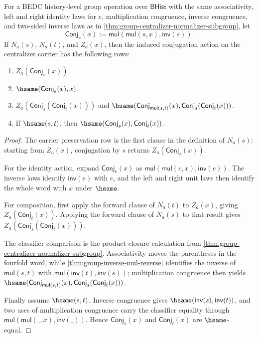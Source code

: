 \begin{theorem}
\label{thm:group-centralizer-normalizer-conjugation-action}
For a BEDC history-level group operation over $\mathsf{BHist}$ with the same
associativity, left and right identity laws for $e$, multiplication
congruence, inverse congruence, and two-sided inverse laws as in
\autoref{thm:group-centralizer-normalizer-subgroup}, let
$$
\mathsf{Conj}_s(x):=
\mathsf{mul}(\mathsf{mul}(s,x),\mathsf{inv}(s)).
$$
If $N_a(s)$, $N_a(t)$, and $Z_a(x)$, then the induced conjugation action on the
centralizer carrier has the following rows:
\begin{enumerate}
\item $Z_a(\mathsf{Conj}_s(x))$.
\item $\hsame(\mathsf{Conj}_e(x),x)$.
\item $Z_a(\mathsf{Conj}_s(\mathsf{Conj}_t(x)))$ and
$\hsame(\mathsf{Conj}_{\mathsf{mul}(s,t)}(x),
\mathsf{Conj}_s(\mathsf{Conj}_t(x)))$.
\item If $\hsame(s,t)$, then
$\hsame(\mathsf{Conj}_s(x),\mathsf{Conj}_t(x))$.
\end{enumerate}
\end{theorem}
\begin{proof}
The carrier preservation row is the first clause in the definition of $N_a(s)$:
starting from $Z_a(x)$, conjugation by $s$ returns
$Z_a(\mathsf{Conj}_s(x))$.

For the identity action, expand $\mathsf{Conj}_e(x)$ as
$\mathsf{mul}(\mathsf{mul}(e,x),\mathsf{inv}(e))$. The inverse laws identify
$\mathsf{inv}(e)$ with $e$, and the left and right unit laws then identify the
whole word with $x$ under $\hsame$.

For composition, first apply the forward clause of $N_a(t)$ to $Z_a(x)$, giving
$Z_a(\mathsf{Conj}_t(x))$. Applying the forward clause of $N_a(s)$ to that
result gives $Z_a(\mathsf{Conj}_s(\mathsf{Conj}_t(x)))$.

The classifier comparison is the product-closure calculation from
\autoref{thm:group-centralizer-normalizer-subgroup}. Associativity moves the
parentheses in the fourfold word, while
\autoref{thm:group-inverse-mul-reverse} identifies the inverse of
$\mathsf{mul}(s,t)$ with $\mathsf{mul}(\mathsf{inv}(t),\mathsf{inv}(s))$;
multiplication congruence then yields
$\hsame(\mathsf{Conj}_{\mathsf{mul}(s,t)}(x),
\mathsf{Conj}_s(\mathsf{Conj}_t(x)))$.

Finally assume $\hsame(s,t)$. Inverse congruence gives
$\hsame(\mathsf{inv}(s),\mathsf{inv}(t))$, and two uses of multiplication
congruence carry the classifier equality through
$\mathsf{mul}(\mathsf{mul}(\_,x),\mathsf{inv}(\_))$. Hence
$\mathsf{Conj}_s(x)$ and $\mathsf{Conj}_t(x)$ are $\hsame$-equal.
\end{proof}

